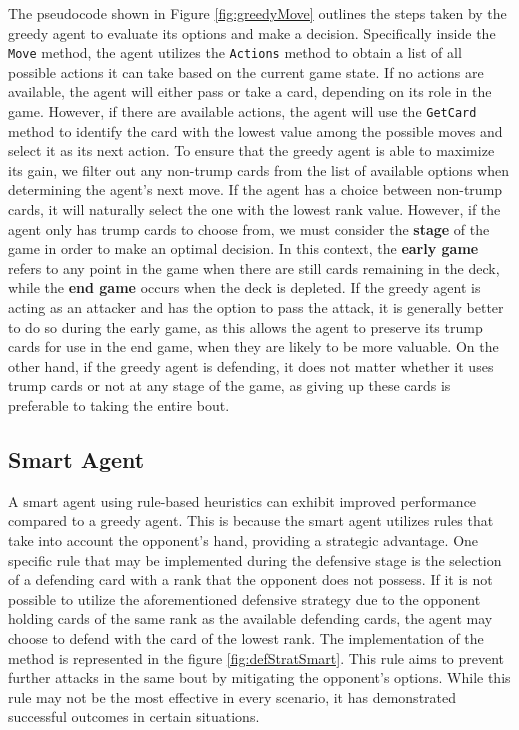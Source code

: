 The pseudocode shown in Figure \ref{fig:greedyMove} outlines the steps taken by the greedy agent to evaluate its options and make a decision. Specifically inside the \texttt{Move} method, the agent utilizes the \texttt{Actions} method to obtain a list of all possible actions it can take based on the current game state. If no actions are available, the agent will either pass or take a card, depending on its role in the game. However, if there are available actions, the agent will use the \texttt{GetCard} method to identify the card with the lowest value among the possible moves and select it as its next action. To ensure that the greedy agent is able to maximize its gain, we filter out any non-trump cards from the list of available options when determining the agent's next move. If the agent has a choice between non-trump cards, it will naturally select the one with the lowest rank value. However, if the agent only has trump cards to choose from, we must consider the \textbf{stage} of the game in order to make an optimal decision. In this context, the \textbf{early game} refers to any point in the game when there are still cards remaining in the deck, while the \textbf{end game} occurs when the deck is depleted. If the greedy agent is acting as an attacker and has the option to pass the attack, it is generally better to do so during the early game, as this allows the agent to preserve its trump cards for use in the end game, when they are likely to be more valuable. On the other hand, if the greedy agent is defending, it does not matter whether it uses trump cards or not at any stage of the game, as giving up these cards is preferable to taking the entire bout.

\subsection{Smart Agent}
A smart agent using rule-based heuristics can exhibit improved performance compared to a greedy agent. This is because the smart agent utilizes rules that take into account the opponent's hand, providing a strategic advantage. One specific rule that may be implemented during the defensive stage is the selection of a defending card with a rank that the opponent does not possess. If it is not possible to utilize the aforementioned defensive strategy due to the opponent holding cards of the same rank as the available defending cards, the agent may choose to defend with the card of the lowest rank.  The implementation of the method is represented in the figure \ref{fig:defStratSmart}. This rule aims to prevent further attacks in the same bout by mitigating the opponent's options. While this rule may not be the most effective in every scenario, it has demonstrated successful outcomes in certain situations.

